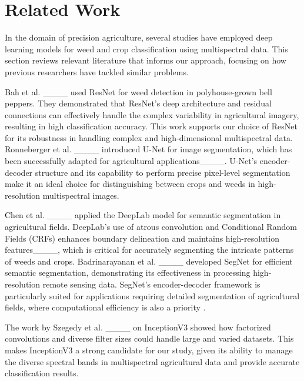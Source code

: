 \section{Related Work}
\vspace{-1mm}
\label{sec:Related work}
\textcolor{black}
In the domain of precision agriculture, several studies have employed deep learning models for weed and crop classification using multispectral data. This section reviews relevant literature that informs our approach, focusing on how previous researchers have tackled similar problems.

\textcolor{black}Bah et al.  ____ used ResNet for weed detection in polyhouse-grown bell peppers. They demonstrated that ResNet's deep architecture and residual connections can effectively handle the complex variability in agricultural imagery, resulting in high classification accuracy. This work supports our choice of ResNet for its robustness in handling complex and high-dimensional multispectral data. \textcolor{black}Ronneberger et al. ____ introduced U-Net for image segmentation, which has been successfully adapted for agricultural applications____. U-Net's encoder-decoder structure and its capability to perform precise pixel-level segmentation make it an ideal choice for distinguishing between crops and weeds in high-resolution multispectral images.

\textcolor{black}Chen et al.  ____ applied the DeepLab model for semantic segmentation in agricultural fields. DeepLab's use of atrous convolution and Conditional Random Fields (CRFs) enhances boundary delineation and maintains high-resolution features____, which is critical for accurately segmenting the intricate patterns of weeds and crops. \textcolor{black}Badrinarayanan et al. ____ developed SegNet for efficient semantic segmentation, demonstrating its effectiveness in processing high-resolution remote sensing data. SegNet’s encoder-decoder framework is particularly suited for applications requiring detailed segmentation of agricultural fields, where computational efficiency is also a priority .

\textcolor{black}The work by Szegedy et al. ____ on InceptionV3 showed how factorized convolutions and diverse filter sizes could handle large and varied datasets. This makes InceptionV3 a strong candidate for our study, given its ability to manage the diverse spectral bands in multispectral agricultural data and provide accurate classification results.

